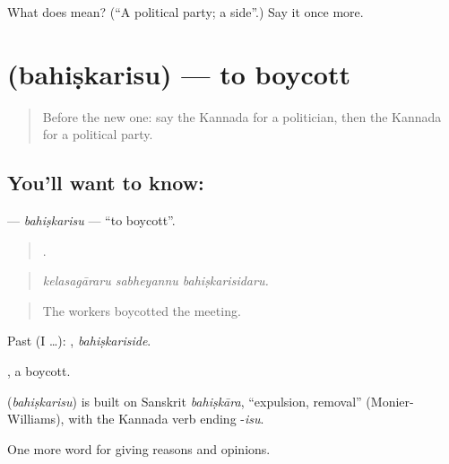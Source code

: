 \begin{tcolorbox}[breakable,colback=teal!4,colframe=teal!35!black,title={Before you move on}]
What does  mean? (\textquotedblleft{}A political party; a side\textquotedblright{}.) Say it once more.
\end{tcolorbox}
\section[\texorpdfstring{\kn{ಬಹಿಷ್ಕರಿಸು} (bahiṣkarisu)}{ಬಹಿಷ್ಕರಿಸು (bahiṣkarisu)}]{ (bahiṣkarisu) — to boycott}

\label{lesson:KA-C394-bahiskarisu}



\begin{quote}
Before the new one: say the Kannada for a politician, then the Kannada for a political party.
\end{quote}

\subsection*{You'll want to know: }
\textbf{} — \emph{bahiṣkarisu} — \textquotedblleft{}to boycott\textquotedblright{}.

\begin{quote}
  .
\end{quote}

\begin{quote}
\emph{kelasagāraru sabheyannu bahiṣkarisidaru.}
\end{quote}

\begin{quote}
The workers boycotted the meeting.
\end{quote}

Past (I …): , \emph{bahiṣkariside}.

, a boycott.

\begin{cousinweb}
\textbf{} (\emph{bahiṣkarisu}) is built on Sanskrit \emph{bahiṣkāra}, \textquotedblleft{}expulsion, removal\textquotedblright{} (Monier-Williams), with the Kannada verb ending -\emph{isu}.
\end{cousinweb}

\begin{grammarlens}[title={What you've built}]
One more word for giving reasons and opinions.
\end{grammarlens}


